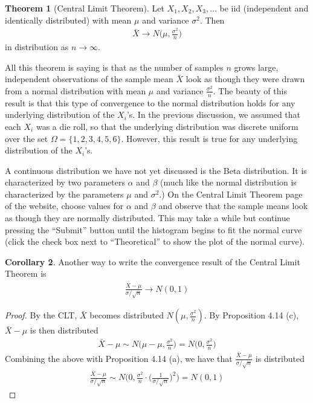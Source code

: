 \documentclass{tufte-book}
\theoremstyle{definition}
\newtheorem{theorem}{Theorem}
\numberwithin{theorem}{section}
\numberwithin{definition}{section}
\numberwithin{lemma}{section}
\newtheorem{corollary}[theorem]{Corollary}
\numberwithin{corollary}{section}
\numberwithin{proposition}{section}
\numberwithin{remark}{section}
\numberwithin{claim}{section}
\numberwithin{observation}{section}
\numberwithin{fact}{section}
\numberwithin{assumption}{section}
\numberwithin{example}{section}
\numberwithin{exercise}{section}
\begin{document}
\begin{theorem}[Central Limit Theorem]
Let $X_1,X_2,X_3,\dots$ be iid (independent and identically distributed) with mean $\mu$ and variance $\sigma^2$. Then
\begin{align*}
\bar{X} \to N\Big(\mu,\frac{\sigma^2}{n}\Big)
\end{align*}
in distribution as $n\to \infty$.
\end{theorem}
All this theorem is saying is that as the number of samples $n$ grows large, independent observations of the sample mean $\bar{X}$ look as though they were drawn from a normal distribution with mean $\mu$ and variance $\frac{\sigma^2}{n}$. The beauty of this result is that this type of convergence to the normal distribution holds for any underlying distribution of the $X_i$'s. In the previous discussion, we assumed that each $X_i$ was a die roll, so that the underlying distribution was discrete uniform over the set $\Omega = \{1,2,3,4,5,6\}$. However, this result is true for any underlying distribution of the $X_i$'s.

A continuous distribution we have not yet discussed is the Beta distribution. It is characterized by two parameters $\alpha$ and $\beta$ (much like the normal distribution is characterized by the parameters $\mu$ and $\sigma^2$.) On the Central Limit Theorem page of the website, choose values for $\alpha$ and $\beta$ and observe that the sample means look as though they are normally distributed. This may take a while but continue pressing the ``Submit'' button until the histogram begins to fit the normal curve (click the check box next to ``Theoretical'' to show the plot of the normal curve).

\begin{corollary}
Another way to write the convergence result of the Central Limit Theorem is
\begin{align*}
\frac{\bar{X} - \mu}{\sigma/\sqrt{n}} \to N(0,1)
\end{align*}
\end{corollary}
\begin{proof}
By the CLT, $\bar{X}$ becomes distributed $N(\mu, \frac{\sigma^2}{n})$. By Proposition 4.14 (c), $\bar{X} - \mu$ is then distributed
\begin{align*}
\bar{X} - \mu \sim N\Big(\mu - \mu, \frac{\sigma^2}{n}\Big) = N\Big(0, \frac{\sigma^2}{n}\Big)
\end{align*}
Combining the above with Proposition 4.14 (a), we have that $\frac{\bar{X} - \mu}{\sigma/\sqrt{n}}$ is distributed
\begin{align*}
\frac{\bar{X} - \mu}{\sigma / \sqrt{n}} \sim N\Big(0, \frac{\sigma^2}{n} \cdot \Big(\frac{1}{\sigma / \sqrt{n}}\Big)^2 \Big) = N(0,1)
\end{align*}

\end{proof}
\end{document}
